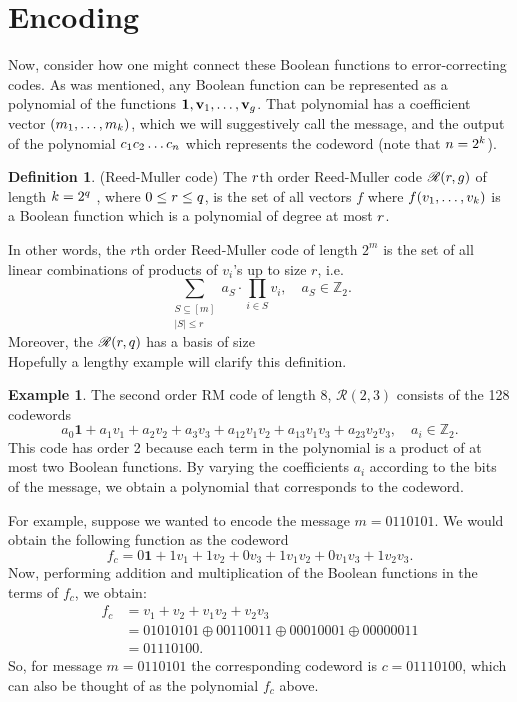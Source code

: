 \documentclass[12pt,twoside]{reedthesis}
\theoremstyle{definition}
\newtheorem{definition}[theorem]{Definition}
\newtheorem{example}[theorem]{Example}
\newcommand{\Z}{\mathbb{Z}}
\begin{document}
\section{Encoding}
Now, consider how one might connect these Boolean functions to error-correcting codes. As was mentioned, any Boolean function can be represented as a polynomial of the functions $\mathbf{1}, \mathbf{v}_{1}, \ldots, \mathbf{v}_{g}$. That polynomial has a coefficient vector $(m_{1}, \ldots, m_{k})$, which we will suggestively call the message, and the output of the polynomial $c_{1}c_{2} \ldots c_{n}$ which represents the codeword (note that $n = 2^k$). 

\begin{definition} (Reed-Muller code) The $r$th order Reed-Muller code $\mathscr{R}(r, g)$ of length $k = 2^q$ , where $0 \leq r \leq q$, is the set of all vectors $f$ where $f(v_{1}, \ldots, v_{k})$ is a Boolean function which is a polynomial of degree at most $r$.
\end{definition}

In other words, the $r$th order Reed-Muller code of length $2^m$ is the set of all linear combinations of products of $v_i$'s up to size $r$, i.e.
\begin{equation} \label{reed_muller_poly}
\sum_{\substack{S \subseteq [m] \\ \lvert S \rvert \leq r}} a_S \cdot \prod_{i \in S} v_i,  \quad a_S \in \Z_2.
\end{equation}
Moreover, the $\mathscr{R}(r, q)$ has a basis of size
\begin{equation}
\end{equation}
Hopefully a lengthy example will clarify this definition.
\begin{example}
The second order RM code of length 8, $\mathscr{R}(2,3)$ consists of the 128 codewords
\begin{equation*} 
a_0\mathbf{1} + a_1v_1 + a_2v_2 + a_3v_3 + a_{12}v_1v_2 + a_{13}v_1v_3 + a_{23}v_2v_3, \quad a_i \in \Z_2. 
\end{equation*}
This code has order 2 because each term in the polynomial is a product of at most two Boolean functions. By varying the coefficients $a_i$ according to the bits of the message, we obtain a polynomial that corresponds to the codeword. 

For example, suppose we wanted to encode the message $m = 0110101$. We would obtain the following function as the codeword
\begin{equation*}
f_c = 0\mathbf{1} + 1v_1 + 1v_2 + 0v_3 + 1v_1v_2 + 0v_1v_3 + 1v_2v_3.
\end{equation*}
Now, performing addition and multiplication of the Boolean functions in the terms of $f_c$, we obtain: 
\begin{align*}
f_c 
& = v_1 + v_2 + v_1v_2 + v_2v_3 \\
& = 01010101 \oplus 00110011 \oplus 00010001 \oplus 00000011 \\
& = 01110100.
\end{align*}
So, for message $m = 0110101$ the corresponding codeword is $c=01110100$, which can also be thought of as the polynomial $f_c$ above.
\end{example}
\end{document}
